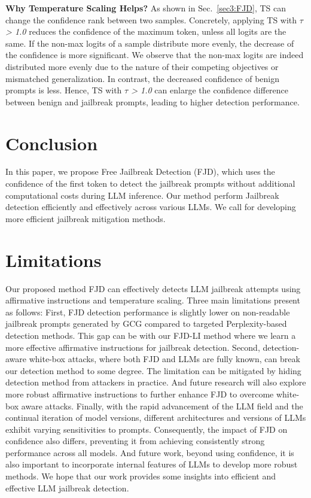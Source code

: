 \documentclass{article}
\begin{document}
\noindent\textbf{Why Temperature Scaling Helps?} As shown in Sec.~\ref{sec3:FJD}, TS can change the confidence rank between two samples. Concretely, applying TS with \textit{$\tau$ > 1.0} reduces the confidence of the maximum token, unless all logits are the same. If the non-max logits of a sample distribute more evenly, the decrease of the confidence is more significant. We observe that the non-max logits are indeed distributed more evenly due to the nature of their competing objectives or mismatched generalization. In contrast, the decreased confidence of benign prompts is less. Hence, TS with \textit{$\tau$ > 1.0} can enlarge the confidence difference between benign and jailbreak prompts, leading to higher detection performance.



\section{Conclusion}

In this paper, we propose Free Jailbreak Detection (FJD), which uses the confidence of the first token to detect the jailbreak prompts without additional computational costs during LLM inference. Our method perform Jailbreak detection efficiently and effectively across various LLMs. We call for developing more efficient jailbreak mitigation methods.

\section*{Limitations}

Our proposed method FJD can effectively detects LLM jailbreak attempts using affirmative instructions and temperature scaling. Three main limitations present as follows: First, FJD detection performance is slightly lower on non-readable jailbreak prompts generated by GCG compared to targeted Perplexity-based detection methods. This gap can be with our FJD-LI method where we learn a more effective affirmative instructions for jailbreak detection. Second, detection-aware white-box attacks, where both FJD and LLMs are fully known, can break our detection method to some degree. The limitation can be mitigated by hiding detection method from attackers in practice. And future research will also explore more robust affirmative instructions to further enhance FJD to overcome white-box aware attacks. Finally, with the rapid advancement of the LLM field and the continual iteration of model versions, different architectures and versions of LLMs exhibit varying sensitivities to prompts. Consequently, the impact of FJD on confidence also differs, preventing it from achieving consistently strong performance across all models. And future work, beyond using confidence, it is also important to incorporate internal features of LLMs to develop more robust methods. We hope that our work provides some insights into efficient and effective LLM jailbreak detection. 
\end{document}
